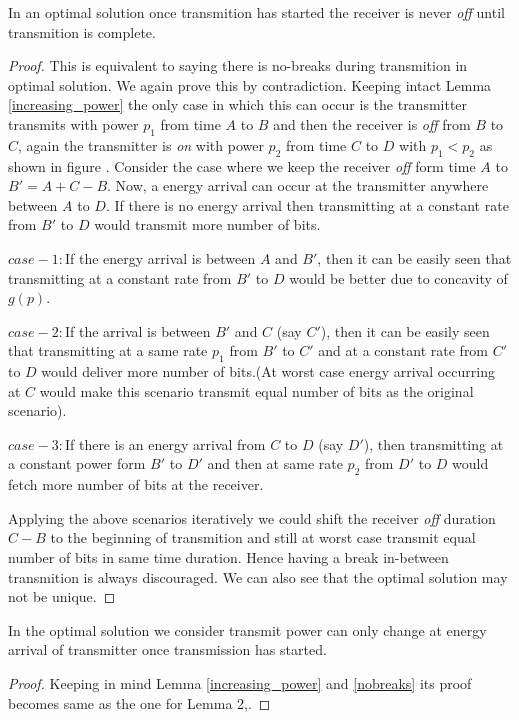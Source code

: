 \begin{lemma}
In an optimal solution once transmition has started the receiver is never \textit{off} until transmition is complete. \label{nobreaks}
\end{lemma}
\begin{proof}
This is equivalent to saying there is no-breaks during transmition in optimal solution. We again prove this by contradiction. Keeping intact Lemma \ref{increasing_power} the only case in which this can occur is the transmitter transmits with power $p_1$ from time $A$ to $B$ and then the receiver is \textit{off} from $B$ to $C$, again the transmitter is \textit{on} with power $p_2$ from time $C$ to $D$ with $p_1<p_2$ as shown in figure . Consider the case where we keep the receiver \textit{off} form time $A$ to $B'=A+C-B$. Now, a energy arrival can occur at the transmitter anywhere between $A$ to $D$. If there is no energy arrival then transmitting at a constant rate from $B'$ to $D$ would transmit more number of bits.

$case-1:$If the energy arrival is between $A$ and $B'$, then it can be easily seen that transmitting at a constant rate from $B'$ to $D$ would be better due to concavity of $g(p)$.

$case-2:$If the arrival is between $B'$ and $C$ (say $C'$), then it can be easily seen that transmitting at a same rate $p_1$ from $B'$ to $C'$ and  at a constant rate from $C'$ to $D$ would deliver more number of bits.(At worst case energy arrival occurring at $C$ would make this scenario transmit equal number of bits as the original scenario).

$case-3:$If there is an energy arrival from $C$ to $D$ (say $D'$), then transmitting at a constant power form $B'$ to $D'$ and then at same rate $p_2$ from $D'$ to $D$ would fetch more number of bits at the receiver.

Applying the above scenarios iteratively we could shift the receiver \textit{off} duration $C-B$ to the beginning of transmition and still at worst case transmit equal number of bits in same time duration. Hence having a break in-between transmition is always discouraged. We can also see that the optimal solution may not be unique.
\end{proof}

\begin{lemma}
In the optimal solution we consider transmit power can only change at energy arrival of transmitter once transmission has started. 
\end{lemma}
\begin{proof}
Keeping in mind Lemma \ref{increasing_power} and \ref{nobreaks} its proof becomes same as the one for Lemma 2,\cite{Yang}. 
\end{proof}	